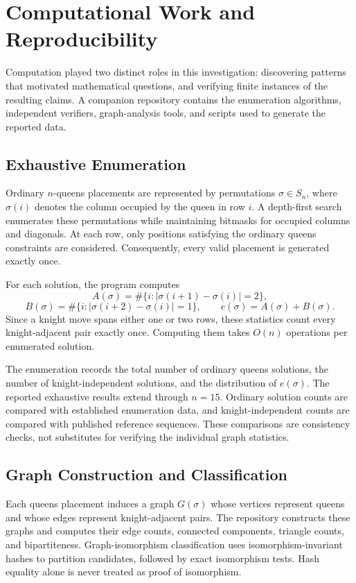 \section{Computational Work and Reproducibility}
\label{sec:computational-work}

Computation played two distinct roles in this investigation: discovering
patterns that motivated mathematical questions, and verifying finite
instances of the resulting claims. A companion repository contains the
enumeration algorithms, independent verifiers, graph-analysis tools, and
scripts used to generate the reported data.

\subsection{Exhaustive Enumeration}

Ordinary $n$-queens placements are represented by permutations
$\sigma\in S_n$, where $\sigma(i)$ denotes the column occupied by the queen
in row $i$. A depth-first search enumerates these permutations while
maintaining bitmasks for occupied columns and diagonals. At each row, only
positions satisfying the ordinary queens constraints are considered.
Consequently, every valid placement is generated exactly once.

For each solution, the program computes
\[
A(\sigma)=\#\{i:|\sigma(i+1)-\sigma(i)|=2\},
\]
\[
B(\sigma)=\#\{i:|\sigma(i+2)-\sigma(i)|=1\},
\qquad e(\sigma)=A(\sigma)+B(\sigma).
\]
Since a knight move spans either one or two rows, these statistics count
every knight-adjacent pair exactly once. Computing them takes $O(n)$
operations per enumerated solution.

The enumeration records the total number of ordinary queens solutions,
the number of knight-independent solutions, and the distribution of
$e(\sigma)$. The reported exhaustive results extend through $n=15$.
Ordinary solution counts are compared with established enumeration data,
and knight-independent counts are compared with published reference
sequences. These comparisons are consistency checks, not substitutes for
verifying the individual graph statistics.

\subsection{Graph Construction and Classification}

Each queens placement induces a graph $G(\sigma)$ whose vertices represent
queens and whose edges represent knight-adjacent pairs. The repository
constructs these graphs and computes their edge counts, connected
components, triangle counts, and bipartiteness. Graph-isomorphism
classification uses isomorphism-invariant hashes to partition candidates,
followed by exact isomorphism tests. Hash equality alone is never treated
as proof of isomorphism.

